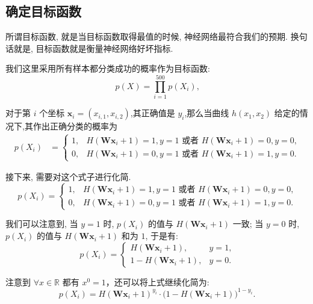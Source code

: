 \subsection{确定目标函数}
\begin{frame}{\insertsection}{\insertsubsection}
所谓目标函数, 就是当目标函数取得最值的时候, 神经网络最符合我们的预期. 换句话就是, 目标函数就是衡量神经网络好坏指标.

我们这里采用所有样本都分类成功的概率作为目标函数:
\[
p(X) = \prod_{i = 1}^{500} p(X_i)\text{,}
\]

对于第 $i$ 个坐标 $\bm{x}_i = (x_{i, 1}, x_{i, 2})$,其正确值是 $y_i$,那么当曲线 $h(x_1, x_2)$ 给定的情况下,其作出正确分类的概率为%
%
\begin{align*}
  p(X_i) &= \left\{
  \begin{array}{ll}
    1, & \text{$H(\bm{W}\bm{x}_i + 1) = 1, y = 1$ 或者 $H(\bm{W}\bm{x}_i + 1) = 0, y = 0$,}\\
    0, & \text{$H(\bm{W}\bm{x}_i + 1) = 0, y = 1$ 或者 $H(\bm{W}\bm{x}_i + 1) = 1, y = 0$.}
  \end{array}
  \right.
\end{align*}
\end{frame}

\begin{frame}{\insertsection}{\insertsubsection}
接下来, 需要对这个式子进行化简.
\[
  p(X_i) = \left\{
  \begin{array}{ll}
    1, & \text{$H(\bm{W}\bm{x}_i + 1) = 1, y = 1$ 或者 $H(\bm{W}\bm{x}_i + 1) = 0, y = 0$,}\\
    0, & \text{$H(\bm{W}\bm{x}_i + 1) = 0, y = 1$ 或者 $H(\bm{W}\bm{x}_i + 1) = 1, y = 0$.}
  \end{array}
  \right.
\]

我们可以注意到, 当 $y = 1$ 时, $p(X_i)$ 的值与 $H(\bm{W}\bm{x}_i + 1)$ 一致; 当 $y = 0$ 时, $p(X_i)$ 的值与 $H(\bm{W}\bm{x}_i + 1)$ 和为 $1$, 于是有:
\[
  p(X_i) = \left\{
  \begin{array}{ll}
    H(\bm{W}\bm{x}_i + 1), & y = 1\text{,}\\
    1 - H(\bm{W}\bm{x}_i + 1), & y = 0\text{.}
  \end{array}
  \right.
\]

注意到 $\forall x \in \mathbb{R}$ 都有 $x^0 = 1$，还可以将上式继续化简为:
\[
  p(X_i) = H(\bm{W}\bm{x}_i + 1)^{y_i}\cdot\big(1 - H(\bm{W}\bm{x}_i + 1)\big)^{1 - y_i}\text{.}
\]
\end{frame}

